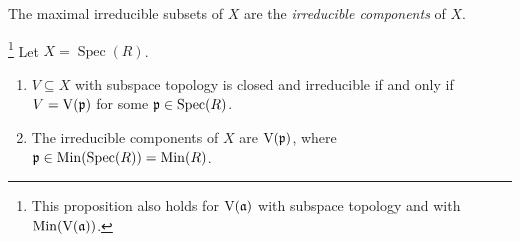 \begin{definition}
    The maximal irreducible subsets of $X$ are the \emph{irreducible components} of $X$.
\end{definition}

\begin{proposition}\footnote[2]{This proposition also holds for $\operatorname{V}(\mathfrak{a})$ with subspace topology and with $\operatorname{Min}(\operatorname{V}(\mathfrak{a}))$.}
    Let $X = \operatorname{Spec}(R)$.
    \begin{enumerate}
        \item $V \subseteq X$ with subspace topology is closed and irreducible if and only if $V = \operatorname{V}(\mathfrak{p})$ for some $\mathfrak{p} \in \operatorname{Spec}(R)$.
        \item The irreducible components of $X$ are $\operatorname{V}(\mathfrak{p})$, where $\mathfrak{p} \in \operatorname{Min}(\operatorname{Spec}(R)) = \operatorname{Min}(R)$.
    \end{enumerate}
\end{proposition}

